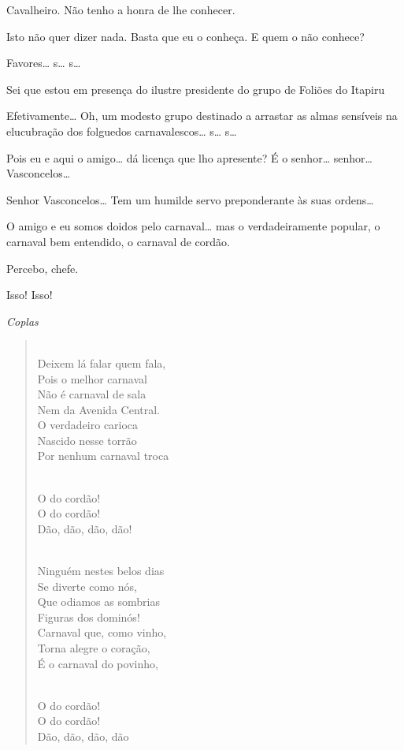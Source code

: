  Cavalheiro.
Não tenho a honra de lhe
conhecer.

 Isto não quer
dizer nada. Basta que eu o conheça. E quem o
não conhece?

 Favores\ldots{} s\ldots{} s\ldots

 Sei que estou em
presença do ilustre presidente do grupo de
Foliões do Itapiru

 Efetivamente\ldots{}  
Oh, um modesto grupo destinado a arrastar as almas sensíveis
na elucubração dos folguedos carnavalescos\ldots{} s\ldots{} s\ldots

 Pois eu e aqui o amigo\ldots{} 
dá licença que lho apresente? É o
senhor\ldots{} senhor\ldots{} Vasconcelos\ldots

 Senhor Vasconcelos\ldots{} Tem um
humilde servo preponderante às suas ordens\ldots

 O amigo e eu somos
doidos pelo carnaval\ldots{} mas o verdadeiramente popular, o carnaval bem
entendido, o carnaval de cordão.

 Percebo, chefe.

 Isso! Isso!

{\smallskip\raggedleft\itshape Coplas\par}
\begin{verse}

\\
Deixem lá falar quem fala,\\
Pois o melhor carnaval\\
Não é carnaval de sala\\
Nem da Avenida Central.\\
O verdadeiro carioca\\
Nascido nesse torrão\\
Por nenhum carnaval troca


 \\
O do cordão!\\
O do cordão!\\
Dão, dão, dão, dão!


\\
Ninguém nestes belos dias\\
Se diverte como nós,\\
Que odiamos as sombrias\\
Figuras dos dominós!\\
Carnaval que, como vinho,\\
Torna alegre o coração,\\
É o carnaval do povinho,


 \\
O do cordão!\\
O do cordão!\\
Dão, dão, dão, dão
\end{verse}


